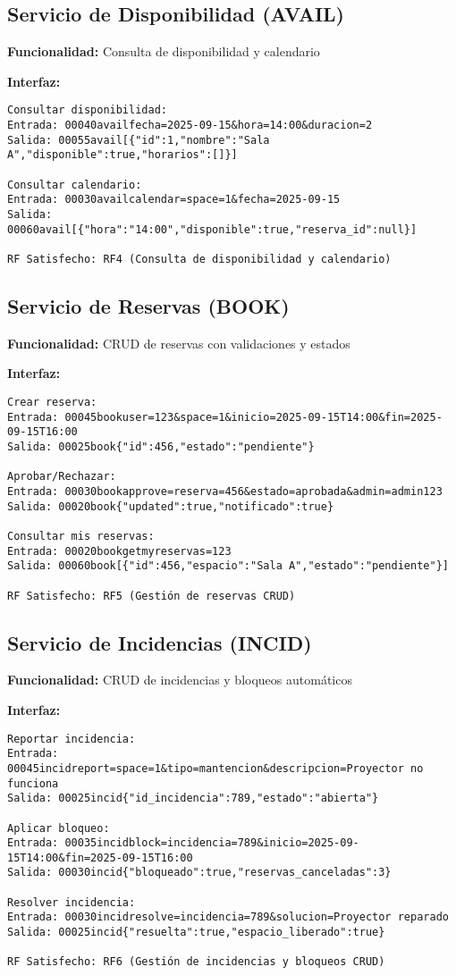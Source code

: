 \documentclass[a4paper, titlepage, 12pt]{article}
\begin{document}
\subsection{Servicio de Disponibilidad (AVAIL)}
\textbf{Funcionalidad:} Consulta de disponibilidad y calendario

\textbf{Interfaz:}
\begin{verbatim}
Consultar disponibilidad:
Entrada: 00040availfecha=2025-09-15&hora=14:00&duracion=2
Salida: 00055avail[{"id":1,"nombre":"Sala A","disponible":true,"horarios":[]}]

Consultar calendario:
Entrada: 00030availcalendar=space=1&fecha=2025-09-15
Salida: 00060avail[{"hora":"14:00","disponible":true,"reserva_id":null}]

RF Satisfecho: RF4 (Consulta de disponibilidad y calendario)
\end{verbatim}

\newpage
\subsection{Servicio de Reservas (BOOK)}
\textbf{Funcionalidad:} CRUD de reservas con validaciones y estados

\textbf{Interfaz:}
\begin{verbatim}
Crear reserva:
Entrada: 00045bookuser=123&space=1&inicio=2025-09-15T14:00&fin=2025-09-15T16:00
Salida: 00025book{"id":456,"estado":"pendiente"}

Aprobar/Rechazar:
Entrada: 00030bookapprove=reserva=456&estado=aprobada&admin=admin123
Salida: 00020book{"updated":true,"notificado":true}

Consultar mis reservas:
Entrada: 00020bookgetmyreservas=123
Salida: 00060book[{"id":456,"espacio":"Sala A","estado":"pendiente"}]

RF Satisfecho: RF5 (Gestión de reservas CRUD)
\end{verbatim}

\subsection{Servicio de Incidencias (INCID)}
\textbf{Funcionalidad:} CRUD de incidencias y bloqueos automáticos

\textbf{Interfaz:}
\begin{verbatim}
Reportar incidencia:
Entrada: 00045incidreport=space=1&tipo=mantencion&descripcion=Proyector no funciona
Salida: 00025incid{"id_incidencia":789,"estado":"abierta"}

Aplicar bloqueo:
Entrada: 00035incidblock=incidencia=789&inicio=2025-09-15T14:00&fin=2025-09-15T16:00
Salida: 00030incid{"bloqueado":true,"reservas_canceladas":3}

Resolver incidencia:
Entrada: 00030incidresolve=incidencia=789&solucion=Proyector reparado
Salida: 00025incid{"resuelta":true,"espacio_liberado":true}

RF Satisfecho: RF6 (Gestión de incidencias y bloqueos CRUD)
\end{verbatim}
\end{document}
